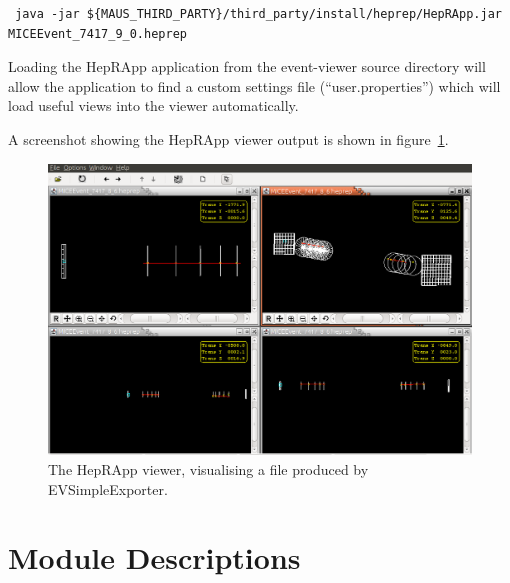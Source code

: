 \documentclass[a4paper,10pt]{article}
\begin{document}
\begin{lstlisting}
 java -jar ${MAUS_THIRD_PARTY}/third_party/install/heprep/HepRApp.jar MICEEvent_7417_9_0.heprep
\end{lstlisting}

Loading the HepRApp application from the event-viewer source directory will allow the application to find a custom settings file (``user.properties'') which will load useful views into the viewer automatically.

A screenshot showing the HepRApp viewer output is shown in figure~\ref{fig:HepRApp}.

\begin{figure}[hbt]
  \begin{center}
    \includegraphics[width=1.0\linewidth]{./graphics/HepRApp.png}
    \caption{The HepRApp viewer, visualising a file produced by EVSimpleExporter.}
    \label{fig:HepRApp}
  \end{center}
\end{figure}

\appendix

\section{Module Descriptions}
\label{ModuleDescriptions}
\end{document}
